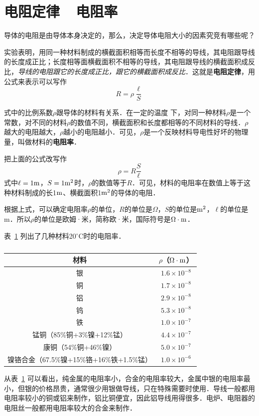 \section{电阻定律~~电阻率}
导体的电阻是由导体本身决定的，那么，决定导体电阻大小的因素究竞有哪些呢？

实验表明，用同一种材料制成的横截面积相等而长度不相等的导线，其电阻跟导线的长度成正比；长度相等面横截面积不相等的导线，其电阻跟导线的横截面积成反比，\textit{导线的电阻跟它的长度成正比，跟它的横截面积成反比}．这就是\textbf{电阻定律}，用公式来表示可以写作
\[R=\rho\frac{\ell}{S}\]

式中的比例系数$\rho$跟导体的材料有关系．在一定的温度
下，对同一种材料$\rho$是一个常数，对不同的材料$\rho$的数值不同，横截面积和长度都相等的不同材料的导线．$\rho$越大的电阻越大，$\rho$越小的电阻越小．可见，$\rho$是一个反映材料导电性好坏的物理量，叫做材料的\textbf{电阻率}．

把上面的公式改写作
\[\rho=R\frac{S}{\ell}\]
式中$\ell=1{\rm m}$，$S=1{\rm m^2}$时，$\rho$的数值等于$R$．可见，材料的电阻率在数值上等于这种材料制成的长1${\rm m}$、横截面积1${\rm m}^2$的导体的电阻．

根据上式，可以确定电阻率$\rho$的单位，$R$的单位是$\Omega$，$S$的单位是${\rm m^2}$，$\ell$的单位是m．所以$\rho$的单位是欧姆·米，简称欧·米，国际符号是$\Omega\cdot {\rm m}$．

表~\ref{tab_B_7-1} 列出了几种材料20$^\circ$C时的电阻率．
\begin{table}[htbp]
	\centering
	\caption{}\label{tab_B_7-1}
    \begin{tabular}{cc}
		\toprule
        材料  & $\rho$（$\Omega\cdot {\rm m}$）\\
    	\midrule
		银   & $ 1.6\times 10^{-8}$   \\
		铜  & $ 1.7\times 10^{-8}$   \\
		铝  & $ 2.9\times 10^{-8}$   \\
		钨  & $ 5.3\times 10^{-8}$   \\
		铁  & $ 1.0\times 10^{-7}$   \\
		锰铜（85\%铜+3\%镍+12\%锰）  & $ 4.4\times 10^{-7}$   \\
		康铜（54\%铜+46\%镍） & $ 5.0\times 10^{-7}$   \\
		镍铬合金（67.5\%镍+15\%铬+16\%铁+1.5\%锰） & $1.0 \times 10^{-6}$   \\
    \bottomrule
    \end{tabular}
\end{table}
从表~\ref{tab_B_7-1} 可以看出，纯金属的电阻率小，合金的电阻率较大，金属中银的电阻率最小，但银的价格昂贵，通常很少用银做导线，只在特殊需要时使用．导线一般都用电阻率较小的铜或铝来制作，铝比铜便宜，因此铝导线用得很多．电炉、电阻器的电阻丝一般都用电阻率较大的合金来制作．

